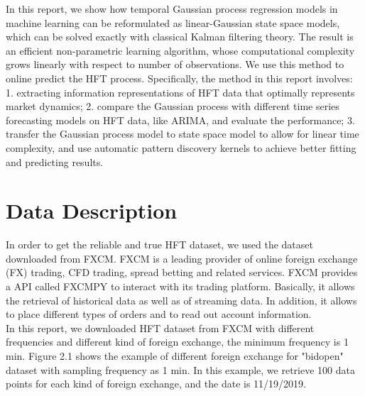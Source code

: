 \documentclass[12pt]{article}
\begin{document}
In this report, we show how temporal Gaussian process regression models in machine learning can be reformulated as linear-Gaussian state space models, which can be solved exactly with classical Kalman filtering theory. The result is an efficient non-parametric learning algorithm, whose computational complexity grows linearly with respect to number of observations. We use this method to online predict the HFT process. Specifically, the method in this report involves: 1. extracting information representations of HFT data that optimally represents market dynamics; 2. compare the Gaussian process with different time series forecasting models on HFT data, like ARIMA, and evaluate the performance; 3. transfer the Gaussian process model to state space model to allow for linear time complexity, and use automatic pattern discovery kernels to achieve better fitting and predicting results.


\section{Data Description}
In order to get the reliable and true HFT dataset, we used the dataset downloaded from FXCM. FXCM is a leading provider of online foreign exchange (FX) trading, CFD trading, spread betting and related services. FXCM provides a API called FXCMPY to interact with its trading platform. Basically, it allows the retrieval of historical data as well as of streaming data. In addition, it allows to place different types of orders and to read out account information. \\

In this report, we downloaded HFT dataset from FXCM with different frequencies and different kind of foreign exchange, the minimum frequency is 1 min. Figure 2.1 shows the example of different foreign exchange for "bidopen" dataset with sampling frequency as 1 min. In this example, we retrieve 100 data points for each kind of foreign exchange, and the date is 11/19/2019. 
\end{document}
